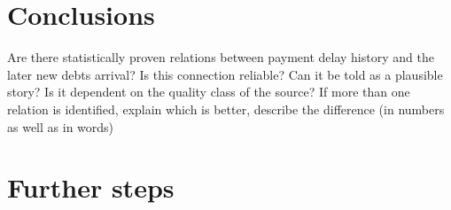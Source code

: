 \documentclass{article}
\begin{document}
\pagebreak

\section{Conclusions}

Are there statistically proven relations between payment delay history and the later new debts arrival?
Is this connection reliable? Can it be told as a plausible story? Is it dependent on the quality class of the source? If more than one relation is identified, explain which is better, describe the difference (in numbers as well as in words)


\section{Further steps}
\end{document}
